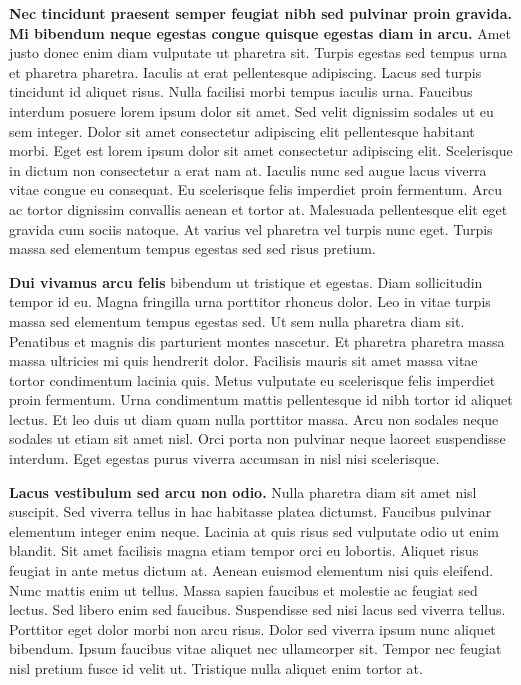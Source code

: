 \documentclass[]{article}
\begin{document}
\textbf{Nec tincidunt praesent semper feugiat nibh sed pulvinar proin gravida. Mi bibendum neque egestas congue quisque egestas diam in arcu.} Amet justo donec enim diam vulputate ut pharetra sit. Turpis egestas sed tempus urna et pharetra pharetra. Iaculis at erat pellentesque adipiscing. Lacus sed turpis tincidunt id aliquet risus. Nulla facilisi morbi tempus iaculis urna. Faucibus interdum posuere lorem ipsum dolor sit amet. Sed velit dignissim sodales ut eu sem integer. Dolor sit amet consectetur adipiscing elit pellentesque habitant morbi. Eget est lorem ipsum dolor sit amet consectetur adipiscing elit. Scelerisque in dictum non consectetur a erat nam at. Iaculis nunc sed augue lacus viverra vitae congue eu consequat. Eu scelerisque felis imperdiet proin fermentum. Arcu ac tortor dignissim convallis aenean et tortor at. Malesuada pellentesque elit eget gravida cum sociis natoque. At varius vel pharetra vel turpis nunc eget. Turpis massa sed elementum tempus egestas sed sed risus pretium.

\textbf{Dui vivamus arcu felis} bibendum ut tristique et egestas. Diam sollicitudin tempor id eu. Magna fringilla urna porttitor rhoncus dolor. Leo in vitae turpis massa sed elementum tempus egestas sed. Ut sem nulla pharetra diam sit. Penatibus et magnis dis parturient montes nascetur. Et pharetra pharetra massa massa ultricies mi quis hendrerit dolor. Facilisis mauris sit amet massa vitae tortor condimentum lacinia quis. Metus vulputate eu scelerisque felis imperdiet proin fermentum. Urna condimentum mattis pellentesque id nibh tortor id aliquet lectus. Et leo duis ut diam quam nulla porttitor massa. Arcu non sodales neque sodales ut etiam sit amet nisl. Orci porta non pulvinar neque laoreet suspendisse interdum. Eget egestas purus viverra accumsan in nisl nisi scelerisque.

\textbf{Lacus vestibulum sed arcu non odio.} Nulla pharetra diam sit amet nisl suscipit. Sed viverra tellus in hac habitasse platea dictumst. Faucibus pulvinar elementum integer enim neque. Lacinia at quis risus sed vulputate odio ut enim blandit. Sit amet facilisis magna etiam tempor orci eu lobortis. Aliquet risus feugiat in ante metus dictum at. Aenean euismod elementum nisi quis eleifend. Nunc mattis enim ut tellus. Massa sapien faucibus et molestie ac feugiat sed lectus. Sed libero enim sed faucibus. Suspendisse sed nisi lacus sed viverra tellus. Porttitor eget dolor morbi non arcu risus. Dolor sed viverra ipsum nunc aliquet bibendum. Ipsum faucibus vitae aliquet nec ullamcorper sit. Tempor nec feugiat nisl pretium fusce id velit ut. Tristique nulla aliquet enim tortor at.
\end{document}
